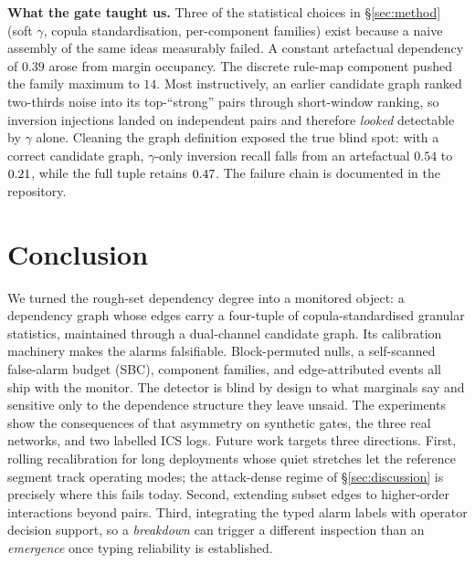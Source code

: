 \documentclass[11pt,a4paper]{article}
\begin{document}
\textbf{What the gate taught us.} Three of the statistical choices in \S\ref{sec:method} (soft $\gamma$, copula standardisation, per-component families) exist because a naive
assembly of the same ideas measurably failed. A constant artefactual
dependency of $0.39$ arose from margin occupancy. The discrete rule-map
component pushed the family maximum to $14$. Most instructively, an earlier
candidate graph ranked two-thirds noise into its top-``strong'' pairs through
short-window ranking, so inversion injections landed on independent pairs and
therefore \emph{looked} detectable by $\gamma$ alone. Cleaning the graph
definition exposed the true blind spot: with a correct candidate graph, $\gamma$-only inversion recall falls from an
artefactual $0.54$ to $0.21$, while the full tuple retains
$0.47$. The failure chain is documented in the repository.

\section{Conclusion}\label{sec:conclusion}

We turned the rough-set dependency degree into a monitored object: a
dependency graph whose edges carry a four-tuple of copula-standardised
granular statistics, maintained through a dual-channel candidate graph. Its
calibration machinery makes the alarms falsifiable. Block-permuted nulls, a
self-scanned false-alarm budget (SBC), component families, and edge-attributed
events all ship with the monitor. The detector is
blind by design to what marginals say and sensitive only to the
dependence structure they leave unsaid. The
experiments show the consequences of that asymmetry on synthetic gates,
the three real networks, and two labelled ICS logs. Future work targets three directions. First, rolling recalibration
for long deployments whose quiet stretches let the reference segment
track operating modes; the attack-dense regime of \S\ref{sec:discussion}
is precisely where this fails today. Second, extending subset edges to
higher-order interactions beyond pairs. Third, integrating the typed
alarm labels with operator decision support, so a \emph{breakdown} can
trigger a different inspection than an \emph{emergence} once typing
reliability is established.



\end{document}
